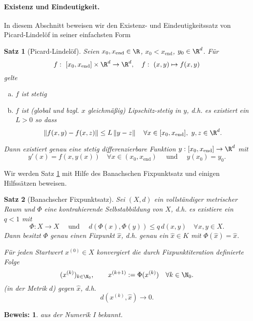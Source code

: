 \documentclass[
]{mycourse}
\theoremstyle{mythm}
\newtheorem{theorem}{Satz}[chapter]
\theoremstyle{break}
\newtheorem*{beweis}{Beweis:}
\newcommand{\norm}[1]{\left\Vert#1\right\Vert}		%
\begin{document}
\paragraph{Existenz und Eindeutigkeit.} 
In diesem Abschnitt beweisen wir den Exis\-tenz- und Eindeutigkeitssatz von Picard-Lindel\"of in seiner einfachsten Form
\begin{theorem}[Picard-Lindel\"of]\label{thm:PL}
Seien $x_0,x_\mathrm{end}\in \R$, $x_0<x_\mathrm{end}$, $y_0\in \R^d$. Für 
\[
f:\ [x_0,x_\mathrm{end}]\times \R^{d}\to \R^d,  \quad f:\ (x,y)\mapsto f(x,y)
\]
gelte
\begin{enumerate}[(a)]
\item $f$ ist stetig
\item $f$ ist (global und bzgl. $x$ gleichmäßig) Lipschitz-stetig in $y$, d.h.
es existiert ein $L>0$ so dass
\[
\norm{f(x,y)-f(x,z)}\leq L \norm{y-z} \quad \forall x\in [x_0,x_\mathrm{end}],\ y,z\in \R^d.
\]
\end{enumerate}

Dann existiert genau eine stetig differenzierbare Funktion
$y: [x_0,x_\mathrm{end}]\to \R^d$ mit 
\[
y'(x)=f(x,y(x)) \quad \forall x\in (x_0,x_\mathrm{end}) \quad \mbox{ und } \quad y(x_0)=y_0.
\]
\end{theorem}

Wir werden Satz \ref{thm:PL} mit Hilfe des Banachschen Fixpunktsatz und einigen Hilfssätzen beweisen. 
\begin{theorem}[Banachscher Fixpunktsatz]
Sei $(X,d)$ ein vollständiger metrischer Raum und $\Phi$ eine 
\emph{kontrahierende Selbstabbildung} von $X$, d.h. es existiere ein $q<1$ mit
\[
\Phi: X\to X  \quad \mbox{ und } \quad d(\Phi(x), \Phi(y))\leq q\,  d(x,y)  \quad \forall x,y\in X.
\]
Dann besitzt $\Phi$ genau einen \emph{Fixpunkt} $\hat x$, d.h. genau ein $\hat x\in K$ mit $\Phi(\hat x)=\hat x$.

Für jeden Startwert $x^{(0)}\in X$ konvergiert die durch \emph{Fixpunktiteration} definierte Folge 
\[
(x^{(k)})_{k\in \N_0}, \qquad x^{(k+1)}:=\Phi(x^{(k)}) \quad \forall k\in \N_0.
\]
(in der Metrik $d$) gegen $\hat x$, d.h.
\[
d(x^{(k)}, \hat x)\to 0.
\]
\end{theorem}
\begin{beweis}
aus der Numerik I bekannt.
\end{beweis}
\end{document}
